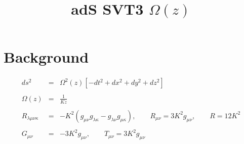 \documentclass[10pt,letterpaper]{article}
\title{adS SVT3 $\Omega(z)$}
\date{}
\numberwithin{equation}{section}
\begin{document}
 
\maketitle
\noindent 
\section{Background}
\begin{eqnarray}
ds^2 &=& \Omega^2(z)\left[ -dt^2 + dx^2+dy^2+dz^2\right]
\\ \nonumber\\
\Omega(z) &=& \frac{1}{Kz}
\\ \nonumber\\
R_{\lambda\mu\nu\kappa} &=& -K^2(g_{\mu\nu}g_{\lambda\kappa} -g_{\lambda\nu}g_{\mu\kappa}),
\qquad R_{\mu\nu} =3K^2 g_{\mu\nu},\qquad R = 12K^2
\\ \nonumber\\
G_{\mu\nu} &=& -3K^2 g_{\mu\nu},\qquad T_{\mu\nu} = 3K^2 g_{\mu\nu}
\end{eqnarray}
%
%
%
\end{document}
